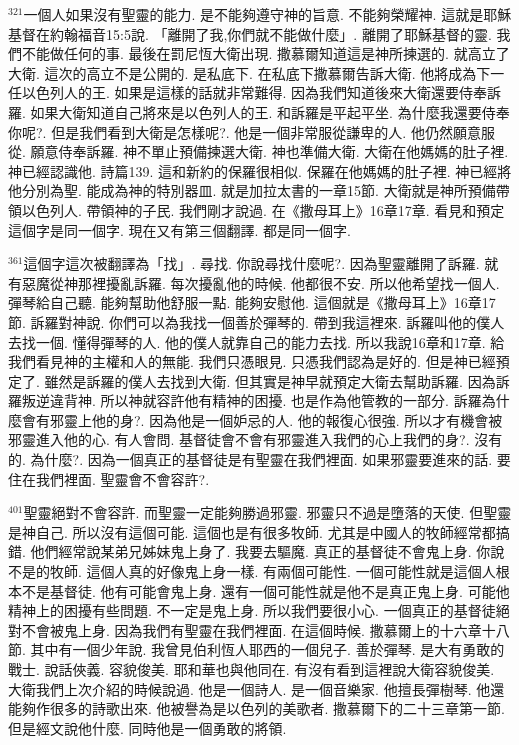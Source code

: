 \documentclass{book}
\begin{document}
$^{321}$一個人如果沒有聖靈的能力.
是不能夠遵守神的旨意.
不能夠榮耀神.
這就是耶穌基督在約翰福音15:5說.
「離開了我,你們就不能做什麼」.
離開了耶穌基督的靈.
我們不能做任何的事.
最後在罰尼恆大衛出現.
撒慕爾知道這是神所揀選的.
就高立了大衛.
這次的高立不是公開的.
是私底下.
在私底下撒慕爾告訴大衛.
他將成為下一任以色列人的王.
如果是這樣的話就非常難得.
因為我們知道後來大衛還要侍奉訴羅.
如果大衛知道自己將來是以色列人的王.
和訴羅是平起平坐.
為什麼我還要侍奉你呢?.
但是我們看到大衛是怎樣呢?.
他是一個非常服從謙卑的人.
他仍然願意服從.
願意侍奉訴羅.
神不單止預備揀選大衛.
神也準備大衛.
大衛在他媽媽的肚子裡.
神已經認識他.
詩篇139.
這和新約的保羅很相似.
保羅在他媽媽的肚子裡.
神已經將他分別為聖.
能成為神的特別器皿.
就是加拉太書的一章15節.
大衛就是神所預備帶領以色列人.
帶領神的子民.
我們剛才說過.
在《撒母耳上》16章17章.
看見和預定這個字是同一個字.
現在又有第三個翻譯.
都是同一個字.

$^{361}$這個字這次被翻譯為「找」.
尋找.
你說尋找什麼呢?.
因為聖靈離開了訴羅.
就有惡魔從神那裡擾亂訴羅.
每次擾亂他的時候.
他都很不安.
所以他希望找一個人.
彈琴給自己聽.
能夠幫助他舒服一點.
能夠安慰他.
這個就是《撒母耳上》16章17節.
訴羅對神說.
你們可以為我找一個善於彈琴的.
帶到我這裡來.
訴羅叫他的僕人去找一個.
懂得彈琴的人.
他的僕人就靠自己的能力去找.
所以我說16章和17章.
給我們看見神的主權和人的無能.
我們只憑眼見.
只憑我們認為是好的.
但是神已經預定了.
雖然是訴羅的僕人去找到大衛.
但其實是神早就預定大衛去幫助訴羅.
因為訴羅叛逆違背神.
所以神就容許他有精神的困擾.
也是作為他管教的一部分.
訴羅為什麼會有邪靈上他的身?.
因為他是一個妒忌的人.
他的報復心很強.
所以才有機會被邪靈進入他的心.
有人會問.
基督徒會不會有邪靈進入我們的心上我們的身?.
沒有的.
為什麼?.
因為一個真正的基督徒是有聖靈在我們裡面.
如果邪靈要進來的話.
要住在我們裡面.
聖靈會不會容許?.

$^{401}$聖靈絕對不會容許.
而聖靈一定能夠勝過邪靈.
邪靈只不過是墮落的天使.
但聖靈是神自己.
所以沒有這個可能.
這個也是有很多牧師.
尤其是中國人的牧師經常都搞錯.
他們經常說某弟兄姊妹鬼上身了.
我要去驅魔.
真正的基督徒不會鬼上身.
你說不是的牧師.
這個人真的好像鬼上身一樣.
有兩個可能性.
一個可能性就是這個人根本不是基督徒.
他有可能會鬼上身.
還有一個可能性就是他不是真正鬼上身.
可能他精神上的困擾有些問題.
不一定是鬼上身.
所以我們要很小心.
一個真正的基督徒絕對不會被鬼上身.
因為我們有聖靈在我們裡面.
在這個時候.
撒慕爾上的十六章十八節.
其中有一個少年說.
我曾見伯利恆人耶西的一個兒子.
善於彈琴.
是大有勇敢的戰士.
說話俠義.
容貌俊美.
耶和華也與他同在.
有沒有看到這裡說大衛容貌俊美.
大衛我們上次介紹的時候說過.
他是一個詩人.
是一個音樂家.
他擅長彈樹琴.
他還能夠作很多的詩歌出來.
他被譽為是以色列的美歌者.
撒慕爾下的二十三章第一節.
但是經文說他什麼.
同時他是一個勇敢的將領.
\end{document}
